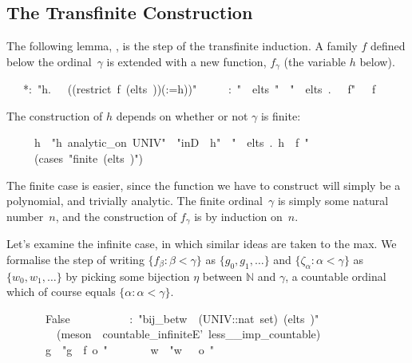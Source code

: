 \documentclass[runningheads]{llncs}
\begin{document}
\subsection{The Transfinite Construction}

The following lemma, \isa{*}, is the step of the transfinite induction.
A family $f$ defined below the ordinal~$\gamma$ is extended with a new function, $f_\gamma$ (the variable $h$ below).

\begin{isabelle}
\ \ \ *:\ "\isasymexists h.\ \isasymPhi \ \isasymgamma \ ((restrict\ f\ (elts\ \isasymgamma ))(\isasymgamma :=h))"\isanewline
\ \ \ \ \ \isasymgamma :\ "\isasymgamma \ \isasymin \ elts\ "\ \ "\isasymforall \isasymbeta \ \isasymin \ elts\ \isasymgamma .\ \isasymPhi \ \isasymbeta \ f"\ \ \isasymgamma \ f
\end{isabelle}

\noindent
The construction of $h$ depends on whether or not $\gamma$ is finite:
\begin{isabelle}
\ \ \ \ \ h\ \ "h\ analytic\_on\ UNIV"\ \ "inD\ \isasymgamma \ h"\ \ "\isasymforall \isasymbeta \ \isasymin \ elts\ \isasymgamma .\ h\ \isasymnoteq \ f\ \isasymbeta"\isanewline
\ \ \ \ \ (cases\ "finite\ (elts\ \isasymgamma )")
\end{isabelle}
%
The finite case is easier, since the function we have to construct will simply be a polynomial, and trivially analytic. The finite ordinal~$\gamma$ is simply some natural number~$n$, and the construction of $f_\gamma$ is by induction on~$n$. 

Let's examine the infinite case, in which similar ideas are taken to the max.
We formalise the step of writing $\{f_\beta: \beta<\gamma\}$ as $\{g_0, g_1, \ldots\}$
and $\{\zeta_\alpha : \alpha < \gamma\}$ as $\{w_0, w_1, \ldots\}$
by picking some bijection $\eta$ between $\mathbb{N}$ and $\gamma$, a countable ordinal which of course equals $\{\alpha:\alpha<\gamma\}$. 


\begin{isabelle}
\ \ \ \ \ \ \ False\isanewline
\ \ \ \ \ \ \ \ \isasymeta \ \ \isasymeta :\ "bij\_betw\ \isasymeta \ (UNIV::nat\ set)\ (elts\ \isasymgamma )"\isanewline
\ \ \ \ \ \ \ \ \ (meson\ \isasymgamma \ countable\_infiniteE'\ less\_\_imp\_countable)\isanewline
\ \ \ \ \ \ \ g\ \ "g\ \isasymequiv \ f\ o\ \isasymeta "\isanewline
\ \ \ \ \ \ \ w\ \ "w\ \isasymequiv \ \isasymzeta \ o\ \isasymeta "
\end{isabelle}
\end{document}
